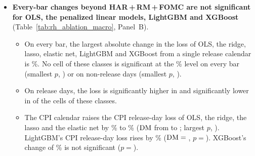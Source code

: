 \begin{itemize}
\begin{itemize}
    days, it is significantly lower in \rhmsPanARelTreeNSigLower{} and significantly higher in
    \rhmsPanARelTreeNSigHigher{} of them.
  \item No cell of the ridge, lasso and elastic net is significant at the \rhmsSigLevel\% level on non-release days
    (smallest $p$,
    \rhmsPanANrelPenPMin). On release days, their loss is significantly lower in \rhmsPanARelPenNSigLower{} and
    significantly higher in \rhmsPanARelPenNSigHigher{} of their cells.
  \item On every bar, the largest absolute change in the loss of the random forest from a single release calendar is
    \rhmsPanAAllForestMaxAbsPct\%. No cell of the random forest is significant at the \rhmsSigLevel\% level on every
    bar (smallest $p$, \rhmsPanAAllForestPMin) or on non-release days (smallest $p$, \rhmsPanANrelForestPMin). On
    release days, its loss is significantly lower in \rhmsPanARelForestNSigLower{} and significantly higher in
    \rhmsPanARelForestNSigHigher{} of its \rhmsPanARelForestNCells{} cells.
  \end{itemize}
\item \textbf{Every-bar changes beyond HAR\,+\,RM\,+\,FOMC are not significant for OLS, the penalized linear models,
  LightGBM and XGBoost} (Table~\ref{tab:rh_ablation_macro}, Panel~B).
  \begin{itemize}
  \item On every bar, the largest absolute change in the loss of OLS, the ridge, lasso, elastic net, LightGBM and
    XGBoost from a single release calendar is \rhmsPanBAllMaxAbsPct\%. No cell of these classes is significant at the
    \rhmsSigLevel\% level
    on every bar (smallest $p$, \rhmsPanBAllPMin) or on non-release days (smallest $p$, \rhmsPanBNrelPMin).
  \item On release days, the loss is significantly higher in \rhmsPanBRelNSigHigher{} and significantly lower in
    \rhmsPanBRelNSigLower{} of the \rhmsPanBRelNCells{} cells of these classes.
  \item The CPI calendar raises the CPI release-day loss of OLS, the ridge, the lasso and the elastic net by
    \rhmsPanBCpiRelLinPctMin\% to \rhmsPanBCpiRelLinPctMax\% ($\mathrm{DM}$ from \rhmsPanBCpiRelLinDmMin{} to
    \rhmsPanBCpiRelLinDmMax; largest $p$, \rhmsPanBCpiRelLinPMax). LightGBM's CPI release-day loss rises by
    \rhabLgbmAddRmFomcMacCpiRelPct\% ($\mathrm{DM} = {}$\rhabLgbmAddRmFomcMacCpiRelDm, $p = {}$\rhabLgbmAddRmFomcMacCpiRelP).
    XGBoost's change of \rhabXgbAddRmFomcMacCpiRelPct\% is not significant ($p = {}$\rhabXgbAddRmFomcMacCpiRelP).

\end{itemize}
\end{itemize}
